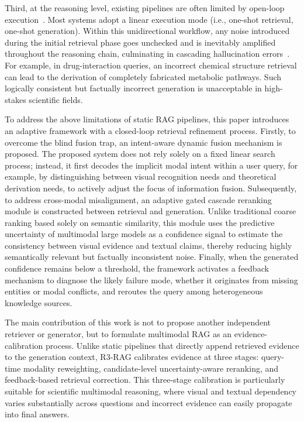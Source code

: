 \documentclass[a4paper, fleqn]{cas-dc}
\begin{document}
Third, at the reasoning level, existing pipelines are often limited by open-loop execution~\cite{Asai2024}.
Most systems adopt a linear execution mode (i.e., one-shot retrieval, one-shot generation).
Within this unidirectional workflow, any noise introduced during the initial retrieval phase goes unchecked and is inevitably amplified throughout the reasoning chain, culminating in cascading hallucination errors~\cite{Yan2024}.
For example, in drug-interaction queries, an incorrect chemical structure retrieval can lead to the derivation of completely fabricated metabolic pathways.
Such logically consistent but factually incorrect generation is unacceptable in high-stakes scientific fields.

To address the above limitations of static RAG pipelines, this paper introduces an adaptive framework with a closed-loop retrieval refinement process.
Firstly, to overcome the blind fusion trap, an intent-aware dynamic fusion mechanism is proposed.
The proposed system does not rely solely on a fixed linear search process; instead, it first decodes the implicit modal intent within a user query, for example, by distinguishing between visual recognition needs and theoretical derivation needs, to actively adjust the focus of information fusion.
Subsequently, to address cross-modal misalignment, an adaptive gated cascade reranking module is constructed between retrieval and generation.
Unlike traditional coarse ranking based solely on semantic similarity, this module uses the predictive uncertainty of multimodal large models as a confidence signal to estimate the consistency between visual evidence and textual claims, thereby reducing highly semantically relevant but factually inconsistent noise.
Finally, when the generated confidence remains below a threshold, the framework activates a feedback mechanism to diagnose the likely failure mode, whether it originates from missing entities or modal conflicts, and reroutes the query among heterogeneous knowledge sources.

The main contribution of this work is not to propose another independent retriever or generator, but to formulate multimodal RAG as an evidence-calibration process. Unlike static pipelines that directly append retrieved evidence to the generation context, R3-RAG calibrates evidence at three stages: query-time modality reweighting, candidate-level uncertainty-aware reranking, and feedback-based retrieval correction. This three-stage calibration is particularly suitable for scientific multimodal reasoning, where visual and textual dependency varies substantially across questions and incorrect evidence can easily propagate into final answers.
\end{document}
